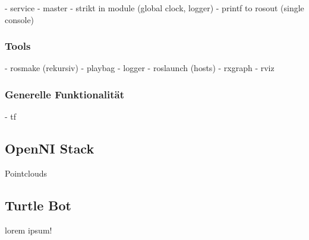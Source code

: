 {\color{red}
- service
- master
- strikt in module (global clock, logger)
- printf to rosout (single console)
}

\subsubsection{Tools}
{\color{red}
- rosmake (rekursiv)
- playbag
- logger
- roslaunch (hosts)
- rxgraph
- rviz
}

\subsubsection{Generelle Funktionalität}
{\color{red}
- tf
}

\subsection{OpenNI Stack}
{\color{red}Pointclouds}


\subsection{Turtle Bot}
{\color{red}lorem ipsum!}